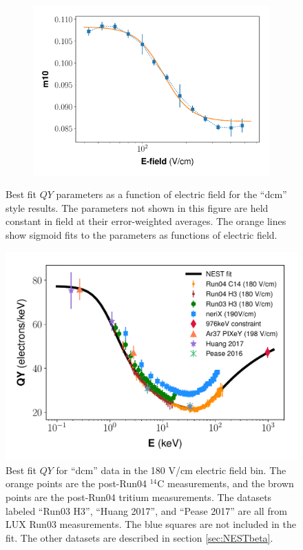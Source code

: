 \begin{figure}[h!]
\begin{subfigure}{0.45\textwidth}
  \includegraphics[width=\textwidth]{Figures/Yields_fit_old/NEST_m10_fit_old_dcm.pdf}
  \caption{}
\end{subfigure}
\caption{Best fit $QY$ parameters as a function of electric field for the ``dcm'' style results. The parameters not shown in this figure are held constant in field at their error-weighted averages. The orange lines show sigmoid fits to the parameters as functions of electric field.}
\label{fig:dcm_prelim_params}
\end{figure}


\begin{figure}[h!]
  \centering
  \includegraphics[width=\textwidth]{Figures/Yields_fit_old/NEST_fit_180Vcm_old_dcm.pdf}
  \caption{Best fit $QY$ for ``dcm'' data in the 180 V/cm electric field bin. The orange points are the post-Run04 $^{14}$C measurements, and the brown points are the post-Run04 tritium measurements. The datasets labeled ``Run03 H3'', ``Huang 2017'', and ``Pease 2017'' are all from LUX Run03 measurements. The blue squares are not included in the fit. The other datasets are described in section \ref{sec:NESTbeta}.}
  \label{fig:dcm_prelim_QY180}
\end{figure}


